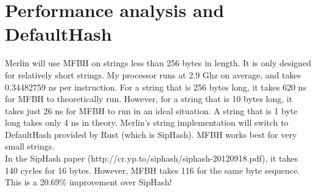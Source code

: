 \documentclass{article}
\begin{document}
\section{Performance analysis and DefaultHash}
Merlin will use MFBH on strings less than 256 bytes in length.
It is only designed for relatively short strings. My processor runs at 2.9 Ghz on average, and takes 0.34482759 ns per instruction.
For a string that is 256 bytes long, it takes 620 ns for MFBH to theoretically run.
However, for a string that is 10 bytes long, it takes just 26 ns for MFBH to run in an ideal situation.
A string that is 1 byte long takes only 4 ns in theory. Merlin's
string implementation will switch to DefaultHash provided by Rust (which is SipHash).
MFBH works best for very small strings.\\

In the SipHash paper (http://cr.yp.to/siphash/siphash-20120918.pdf), it takes 140 cycles for 16 bytes.
However, MFBH takes 116 for the same byte sequence. This is a 20.69\% improvement over SipHash!
\end{document}
